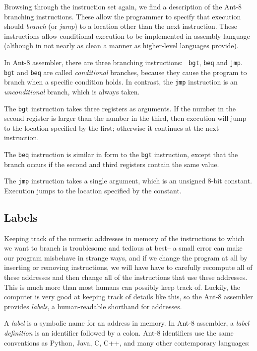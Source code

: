 Browsing through the instruction set again, we find a description of
the {\sc Ant-8} branching instructions.  These allow the programmer to specify
that execution should {\em branch} (or {\em jump}) to a location other
than the next instruction.  These instructions allow conditional
execution to be implemented in assembly language (although in not
nearly as clean a manner as higher-level languages provide).

In {\sc Ant-8} assembler, there are three branching instructions:  {\tt
bgt}, {\tt beq} and {\tt jmp}.  {\tt bgt} and {\tt beq} are called
{\em conditional} branches, because they cause the program to branch
when a specific condition holds.  In contrast, the {\tt jmp}
instruction is an {\em unconditional} branch, which is always taken.

The {\tt bgt} instruction takes three registers as arguments.  If the
number in the second register is larger than the number in the third,
then execution will jump to the location specified by the first;
otherwise it continues at the next instruction.

The {\tt beq} instruction is similar in form to the {\tt bgt}
instruction, except that the branch occurs if the second and third
registers contain the same value.

The {\tt jmp} instruction takes a single argument, which is an
unsigned 8-bit constant.  Execution jumps to the location specified by
the constant.

\subsection{Labels}
\label{Labels-subsec}

Keeping track of the numeric addresses in memory of the instructions
to which we want to branch is troublesome and tedious at best-- a small
error can make our program misbehave in strange ways, and if we change
the program at all by inserting or removing instructions, we will have
have to carefully recompute all of these addresses and then change all
of the instructions that use these addresses.  This is much more than
most humans can possibly keep track of.  Luckily, the computer is very
good at keeping track of details like this, so the {\sc Ant-8} assembler
provides {\em labels}, a human-readable shorthand for addresses.

A {\em label} is a symbolic name for an address in memory.  In {\sc Ant-8}
assembler, a {\em label definition} is an identifier followed by a colon.
{\sc Ant-8} identifiers use the same conventions as Python, Java, C, C++, and
many other contemporary languages:

